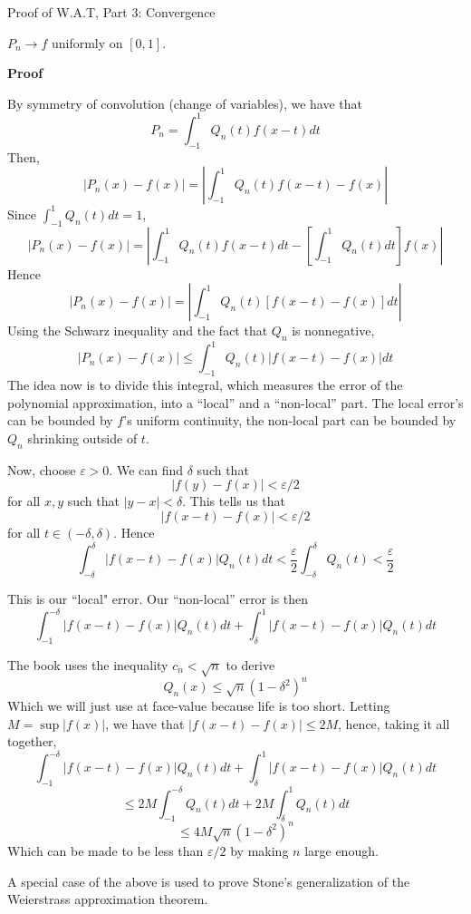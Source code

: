 \begin{theorem} Proof of W.A.T, Part 3: Convergence

    $P_n \rightarrow f$ uniformly on $[0, 1]$.

    \textbf{Proof}
    
    By symmetry of convolution (change of variables), we have that
    \[P_n = \int_{-1}^1 Q_n(t)f(x-t)dt\]
    Then,
    \[|P_n(x) - f(x)| = \left|\int_{-1}^1 Q_n(t) f(x-t) - f(x)\right|\] 
    Since $\int_{-1}^1 Q_n(t)dt = 1$,
\[|P_n(x) - f(x)| =\left|\int_{-1}^1 Q_n(t)f(x-t) dt - \left[\int_{-1}^1 Q_n(t)dt\right]f(x)\right|\]
Hence
\[|P_n(x) - f(x)| =\left|\int_{-1}^1 Q_n(t)[f(x-t)-f(x)] dt\right|\]
Using the Schwarz inequality and the fact that $Q_n$ is nonnegative, 
\[|P_n(x) - f(x)| \leq \int_{-1}^1 Q_n(t)\big|f(x-t)-f(x)\big| dt\]
The idea now is to divide this integral, which measures the error of the polynomial approximation, into a ``local'' and a ``non-local'' part. The local error's can be bounded by $f$'s uniform continuity, the non-local part can be bounded by $Q_n$ shrinking outside of $t$.

Now, choose $\varepsilon > 0$. We can find $\delta$ such that 
\[|f(y) - f(x)| < \varepsilon/2\]
for all $x, y$ such that $|y-x| < \delta$. This tells us that 
\[|f(x-t) - f(x)| < \varepsilon/2\]
for all $t \in (-\delta, \delta)$. Hence
\[\int_{-\delta}^\delta |f(x-t) - f(x)| Q_n(t) dt < \frac{\varepsilon}{2}\int_{-\delta}^\delta Q_n(t) < \frac{\varepsilon}{2}\]

This is our ``local" error. Our ``non-local'' error is then
\[\int_{-1}^{-\delta} |f(x-t)-f(x)|Q_n(t)dt + \int_{\delta}^1 |f(x-t)-f(x)|Q_n(t)dt\]
\end{theorem}

\begin{consequence}
    The book uses the inequality $c_n < \sqrt{n}$ to derive
    \[Q_n(x) \leq \sqrt{n}(1-\delta^2)^n\]
    Which we will just use at face-value because life is too short. Letting $M = \sup |f(x)|$, we have that $|f(x-t) - f(x)| \leq 2M$, hence, taking it all together, 
\[\int_{-1}^{-\delta} |f(x-t)-f(x)|Q_n(t)dt + \int_{\delta}^1 |f(x-t)-f(x)|Q_n(t)dt\]
\[\leq 2M \int_{-1}^{-\delta}Q_n(t)dt + 2M \int_{\delta}^{1}Q_n(t)dt\]
\[\leq 4M \sqrt{n}(1-\delta^2)^n\]
Which can be made to be less than $\varepsilon/2$ by making $n$ large enough.
\end{consequence}

A special case of the above is used to prove Stone's generalization of the Weierstrass approximation theorem.

